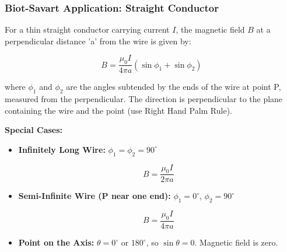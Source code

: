 \begin{frame}[t]
    \frametitle{\textcolor{deepnavy}{\textbf{Biot-Savart Application: Straight Conductor}}}
    \renewcommand{\familydefault}{\rmdefault}
    \small

      \item<+-> For a thin straight conductor carrying current $I$, the magnetic field $B$ at a perpendicular distance 'a' from the wire is given by:
        \begin{tcolorbox}[colback=orange!8,colframe=accentorange,boxrule=0.5pt,arc=1mm,boxsep=2pt]
        \begin{equation*}
             B = \frac{\mu_0 I}{4\pi a} (\sin\phi_1 + \sin\phi_2)
        \end{equation*}
        \end{tcolorbox}
          where $\phi_1$ and $\phi_2$ are the angles subtended by the ends of the wire at point P, measured from the perpendicular.   The direction is perpendicular to the plane containing the wire and the point (use Right Hand Palm Rule).

    \item<+-> \textbf{Special Cases:}
        \begin{itemize}[<+->]
              \item \textbf{Infinitely Long Wire:} $\phi_1 = \phi_2 = 90^\circ$
            \begin{tcolorbox}[colback=blue!5,colframe=blue!80,boxrule=0.5pt,arc=1mm,boxsep=1pt,left=1pt,right=1pt]
            \begin{equation*}
                 B = \frac{\mu_0 I}{2\pi a}
            \end{equation*}
             \end{tcolorbox}
              \item \textbf{Semi-Infinite Wire (P near one end):} $\phi_1 = 0^\circ$, $\phi_2 = 90^\circ$
            \begin{tcolorbox}[colback=blue!5,colframe=blue!80,boxrule=0.5pt,arc=1mm,boxsep=1pt,left=1pt,right=1pt]
            \begin{equation*}
                 B = \frac{\mu_0 I}{4\pi a}
            \end{equation*}
            \end{tcolorbox}
            \item \textbf{Point on the Axis:} $\theta = 0^\circ$ or $180^\circ$, so $\sin\theta = 0$.   Magnetic field is zero.
        \end{itemize}
\end{frame}


